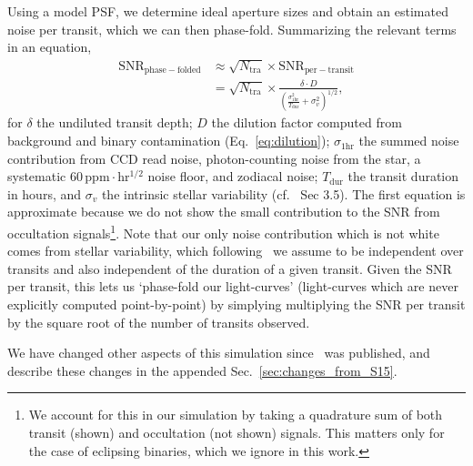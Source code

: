 Using a model PSF, we determine ideal aperture sizes and obtain 
an estimated noise per transit, which we can then phase-fold. 
Summarizing the relevant terms in an equation,
\begin{align}
    \mathrm{SNR}_\mathrm{phase-folded} &\approx
	\sqrt{N_\mathrm{tra}} \times \mathrm{SNR}_\mathrm{per-transit}\nonumber \\
	 &= \sqrt{N_\mathrm{tra}} \times 
	\frac{\delta \cdot D}{\left(\frac{\sigma_\mathrm{1hr}^2}{T_\mathrm{dur}} 
		+ \sigma_v^2 \right)^{1/2}}, 
	\label{eq:snr} 
\end{align}
for $\delta$ the undiluted transit depth; $D$ the dilution factor
computed from background and binary contamination (Eq.~\ref{eq:dilution});
$\sigma_\mathrm{1hr}$ the summed noise contribution from CCD read noise, 
photon-counting noise from the star, a systematic 
$60\,\mathrm{ppm\cdot hr^{1/2}}$ noise floor, and zodiacal noise;
$T_\mathrm{dur}$ the transit duration in hours, and $\sigma_v$ the intrinsic
stellar variability (cf.~ Sec 3.5).
The first equation is approximate because we do not
show the small contribution to the SNR from occultation 
signals\footnote{We account for this in our simulation by taking a quadrature 
sum of both transit (shown) and occultation (not shown) signals. This matters 
only for the case of eclipsing binaries, which we ignore 
in this work.}.
Note that our only noise contribution which is not white comes from stellar 
variability, 
which following~ we assume to be independent over 
transits and also independent of the duration of a given transit.
Given the SNR per transit, this lets us `phase-fold our light-curves' 
(light-curves which are never explicitly computed point-by-point) by simplying 
multiplying the SNR per transit by the square root of the number of transits
observed.

We have changed other aspects of this simulation
since~ was published, and describe these
changes in the appended Sec.~\ref{sec:changes_from_S15}.
